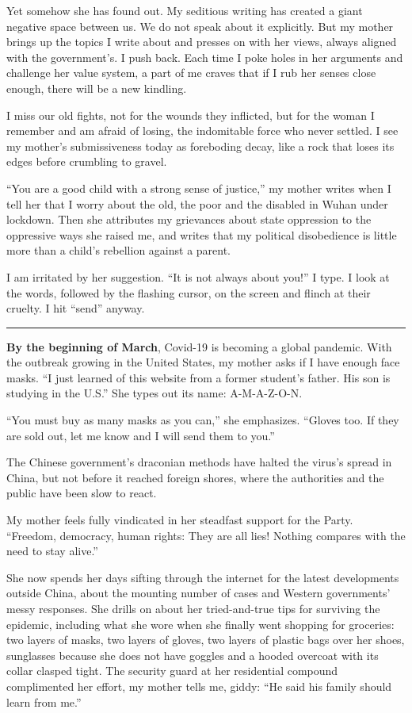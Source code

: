 Yet somehow she has found out. My seditious writing has created a giant
negative space between us. We do not speak about it explicitly. But my
mother brings up the topics I write about and presses on with her views,
always aligned with the government's. I push back. Each time I poke
holes in her arguments and challenge her value system, a part of me
craves that if I rub her senses close enough, there will be a new
kindling.

I miss our old fights, not for the wounds they inflicted, but for the
woman I remember and am afraid of losing, the indomitable force who
never settled. I see my mother's submissiveness today as foreboding
decay, like a rock that loses its edges before crumbling to gravel.

``You are a good child with a strong sense of justice,'' my mother
writes when I tell her that I worry about the old, the poor and the
disabled in Wuhan under lockdown. Then she attributes my grievances
about state oppression to the oppressive ways she raised me, and writes
that my political disobedience is little more than a child's rebellion
against a parent.

I am irritated by her suggestion. ``It is not always about you!'' I
type. I look at the words, followed by the flashing cursor, on the
screen and flinch at their cruelty. I hit ``send'' anyway.

\begin{center}\rule{0.5\linewidth}{\linethickness}\end{center}

\textbf{By the beginning of March}, Covid-19 is becoming a global
pandemic. With the outbreak growing in the United States, my mother asks
if I have enough face masks. ``I just learned of this website from a
former student's father. His son is studying in the U.S.'' She types out
its name: A-M-A-Z-O-N.

``You must buy as many masks as you can,'' she emphasizes. ``Gloves too.
If they are sold out, let me know and I will send them to you.''

The Chinese government's draconian methods have halted the virus's
spread in China, but not before it reached foreign shores, where the
authorities and the public have been slow to react.

My mother feels fully vindicated in her steadfast support for the Party.
``Freedom, democracy, human rights: They are all lies! Nothing compares
with the need to stay alive.''

She now spends her days sifting through the internet for the latest
developments outside China, about the mounting number of cases and
Western governments' messy responses. She drills on about her
tried-and-true tips for surviving the epidemic, including what she wore
when she finally went shopping for groceries: two layers of masks, two
layers of gloves, two layers of plastic bags over her shoes, sunglasses
because she does not have goggles and a hooded overcoat with its collar
clasped tight. The security guard at her residential compound
complimented her effort, my mother tells me, giddy: ``He said his family
should learn from me.''

